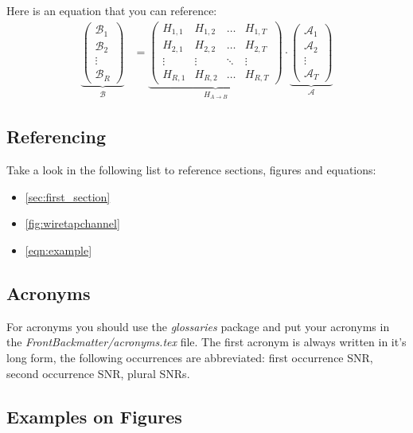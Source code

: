 Here is an equation that you can reference:
\begin{align}
\underbrace{\begin{pmatrix}\mathcal{B}_1\\\mathcal{B}_2\\\vdots\\\mathcal{B}_R\end{pmatrix}}_\mathcal{B} &= \underbrace{\begin{pmatrix}H_{1,1} & H_{1,2} & \hdots & H_{1,T}\\H_{2,1} & H_{2,2} & \hdots & H_{2,T}\\\vdots & \vdots & \ddots & \vdots\\H_{R,1} & H_{R,2} & \hdots & H_{R,T}\end{pmatrix}}_{H_{A\rightarrow B}}\cdot \underbrace{\begin{pmatrix}\mathcal{A}_1\\\mathcal{A}_2\\\vdots\\\mathcal{A}_T\end{pmatrix}}_\mathcal{A}\label{eqn:example}
\end{align}

\subsection{Referencing}

Take a look in the following list to reference sections, figures and equations:
\begin{itemize}
  \item \autoref{sec:first_section}
  \item \autoref{fig:wiretapchannel}
  \item \autoref{eqn:example}
\end{itemize}

\subsection{Acronyms}
For acronyms you should use the \emph{glossaries} package and put your acronyms
in the \emph{FrontBackmatter/acronyms.tex} file. The first acronym is always
written in it's long form, the following occurrences are abbreviated: first
occurrence \gls{SNR}, second occurrence \gls{SNR}, plural \glspl{SNR}.

\subsection{Examples on Figures}

